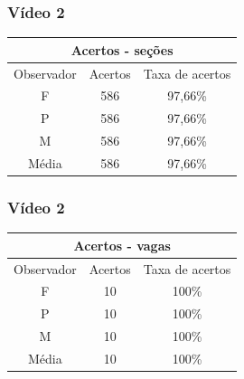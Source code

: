 \documentclass{beamer}
\begin{document}
\begin{frame}
	\frametitle{Vídeo 2}
	
\begin{center}
\begin{tabular}{|c||c||c|}
\hline
\multicolumn{3}{|c|}{Acertos - seções}  \\ \hline \hline
Observador & Acertos & Taxa de acertos \\ \hline
F & 586 & 97,66\% \\  \hline
P & 586 & 97,66\% \\ \hline
M & 586 & 97,66\% \\ \hline
Média & 586 & 97,66\% \\
\hline
\end{tabular}
\end{center}
\end{frame}

\begin{frame}
\frametitle{Vídeo 2}
\begin{center}
\begin{tabular}{|c||c||c|}
\hline
\multicolumn{3}{|c|}{Acertos - vagas}  \\ \hline \hline
Observador & Acertos & Taxa de acertos \\ \hline
F & 10 & 100\% \\  \hline
P & 10 & 100\% \\ \hline
M & 10 & 100\% \\ \hline
Média & 10 & 100\% \\
\hline
\end{tabular}
\end{center}
\end{frame}
\end{document}
